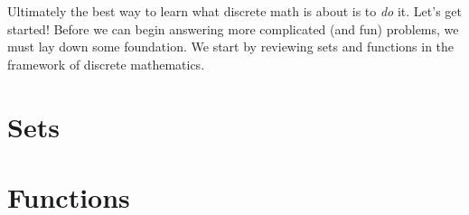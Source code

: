 \documentclass[12pt]{article}
\begin{document}
Ultimately the best way to learn what discrete math is about is to {\em do} it.  Let's get started! Before we can begin answering more complicated (and fun) problems, we must lay down some foundation.  We start by reviewing sets and functions in the framework of discrete mathematics.

\section{Sets}


\section{Functions}



%
%
%
\end{document}
